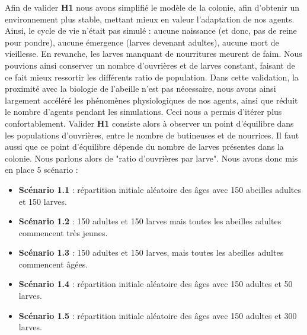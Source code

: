 			Afin de valider \textbf{H1} nous avons simplifié le modèle de la colonie, afin d'obtenir un environnement plus stable, mettant mieux en valeur l'adaptation de nos agents. Ainsi, le cycle de vie n'était pas simulé : aucune naissance (et donc, pas de reine pour pondre), aucune émergence (larves devenant adultes), aucune mort de vieillesse. En revanche, les larves manquant de nourritures meurent de faim. Nous pouvions ainsi conserver un nombre d'ouvrières et de larves constant, faisant de ce fait mieux ressortir les différents ratio de population. Dans cette validation, la proximité avec la biologie de l'abeille n'est pas nécessaire, nous avons ainsi largement accéléré les phénomènes physiologiques de nos agents, ainsi que réduit le nombre d'agents pendant les simulations. Ceci nous a permis d'itérer plus confortablement. Valider \textbf{H1} consiste alors à observer un point d'équilibre dans les populations d'ouvrières, entre le nombre de butineuses et de nourrices. Il faut aussi que ce point d'équilibre dépende du nombre de larves présentes dans la colonie. Nous parlons alors de "ratio d'ouvrières par larve". Nous avons donc mis en place 5 scénario :
			\begin{itemize}
				\item \textbf{Scénario 1.1} : répartition initiale aléatoire des âges avec 150 abeilles adultes et 150 larves.
				\item \textbf{Scénario 1.2} : 150 adultes et 150 larves mais toutes les abeilles adultes commencent très jeunes.
				\item \textbf{Scénario 1.3} : 150 adultes et 150 larves, mais toutes les abeilles adultes commencent âgées.
				\item \textbf{Scénario 1.4} : répartition initiale aléatoire des âges avec 150 adultes et 50 larves.
				\item \textbf{Scénario 1.5} : répartition initiale aléatoire des âges avec 150 adultes et 300 larves.
			\end{itemize}
			
